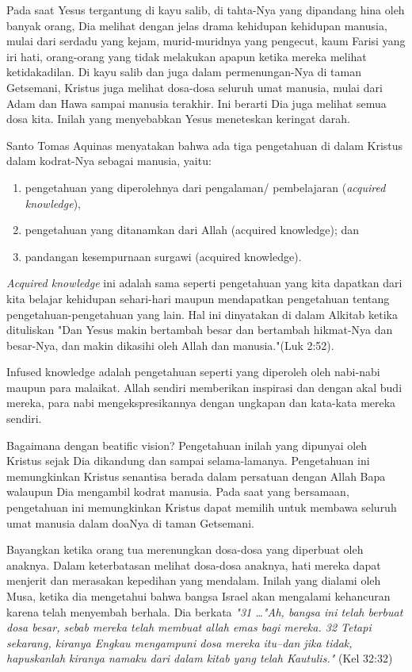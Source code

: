 Pada saat Yesus tergantung di kayu salib, di tahta-Nya yang dipandang hina oleh
banyak orang, Dia melihat dengan jelas drama kehidupan kehidupan manusia, mulai
dari serdadu yang kejam, murid-muridnya yang pengecut, kaum Farisi yang iri
hati, orang-orang yang tidak melakukan apapun ketika mereka melihat
ketidakadilan. Di kayu salib dan juga dalam permenungan-Nya di taman Getsemani,
Kristus juga melihat dosa-dosa seluruh umat manusia, mulai dari Adam dan Hawa
sampai manusia terakhir. Ini berarti Dia juga melihat semua dosa kita. Inilah
yang menyebabkan Yesus meneteskan keringat darah.

Santo Tomas Aquinas menyatakan bahwa ada tiga pengetahuan di dalam Kristus
dalam kodrat-Nya sebagai manusia, yaitu: 
\begin{enumerate}
\item pengetahuan yang diperolehnya dari
pengalaman/ pembelajaran (\textit{acquired knowledge}), 
\item pengetahuan yang ditanamkan
dari Allah (acquired knowledge); dan 
\item pandangan kesempurnaan surgawi (acquired knowledge). 
\end{enumerate}

\textit{Acquired knowledge} ini adalah sama seperti pengetahuan yang kita
dapatkan dari kita belajar kehidupan sehari-hari maupun mendapatkan pengetahuan
tentang pengetahuan-pengetahuan yang lain. Hal ini dinyatakan di dalam Alkitab
ketika dituliskan "Dan Yesus makin bertambah besar dan bertambah hikmat-Nya dan
besar-Nya, dan makin dikasihi oleh Allah dan manusia."(Luk 2:52). 

Infused
knowledge adalah pengetahuan seperti yang diperoleh oleh nabi-nabi maupun para
malaikat. Allah sendiri memberikan inspirasi dan dengan akal budi mereka, para
nabi mengekspresikannya dengan ungkapan dan kata-kata mereka sendiri. 

Bagaimana
dengan beatific vision? Pengetahuan inilah yang dipunyai oleh Kristus sejak Dia
dikandung dan sampai selama-lamanya. Pengetahuan ini memungkinkan Kristus
senantisa berada dalam persatuan dengan Allah Bapa walaupun Dia mengambil
kodrat manusia. Pada saat yang bersamaan, pengetahuan ini memungkinkan Kristus
dapat memilih untuk membawa seluruh umat manusia dalam doaNya di taman
Getsemani.

Bayangkan ketika orang tua merenungkan dosa-dosa yang diperbuat oleh anaknya.
Dalam keterbatasan melihat dosa-dosa anaknya, hati mereka dapat menjerit dan
merasakan kepedihan yang mendalam. Inilah yang dialami oleh Musa, ketika dia
mengetahui bahwa bangsa Israel akan mengalami kehancuran karena telah menyembah
berhala. Dia berkata \textit{"31 …"Ah, bangsa ini telah berbuat dosa besar, sebab
mereka telah membuat allah emas bagi mereka. 32  Tetapi sekarang, kiranya
Engkau mengampuni dosa mereka itu–dan jika tidak, hapuskanlah kiranya namaku
dari dalam kitab yang telah Kautulis."} (Kel 32:32)

